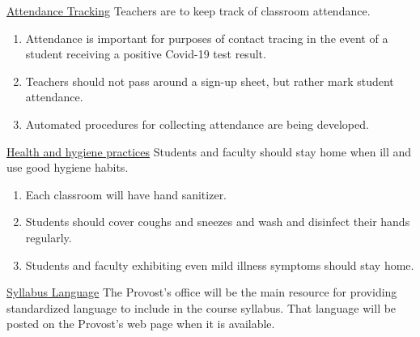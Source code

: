 \documentclass[10pt,fleqn]{article}
\begin{document}
\noindent
    \underline{Attendance Tracking} Teachers are to keep track of classroom
              attendance.
      \begin{enumerate}
        \item Attendance is important for purposes of contact tracing in the
              event of a student receiving a positive Covid-19 test result.
        \item Teachers should not pass around a sign-up sheet, but rather mark
              student attendance.
        \item Automated procedures for collecting attendance are being
              developed.
      \end{enumerate}

\noindent
    \underline{Health and hygiene practices} Students and faculty should stay
              home when ill and use good hygiene habits. 
      \begin{enumerate}
        \item Each classroom will have hand sanitizer.
        \item Students should cover coughs and sneezes and wash and disinfect
              their hands regularly.
        \item Students and faculty exhibiting even mild illness symptoms should
              stay home. 
      \end{enumerate}

\noindent
    \underline{Syllabus Language} The Provost's office will be the main resource
              for providing standardized language to include in the course
              syllabus. That language will be posted on the Provost's web page
              when it is available.
\end{document}
